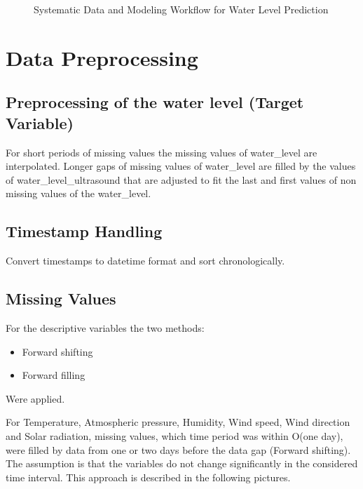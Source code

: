 \documentclass[a4paper,12pt]{article}
\begin{document}
\begin{figure}[H]
{
} %
\caption{Systematic Data and Modeling Workflow for Water Level Prediction}
\label{fig:workflow_pipeline}
\end{figure}

\section{Data Preprocessing}
\subsection{Preprocessing of the water level (Target Variable)}
For short periods of missing values the missing values of water\_level are interpolated. Longer gaps of missing values of water\_level are filled by the values of water\_level\_ultrasound that are adjusted to fit the last and first values of non missing values of the water\_level.

\subsection{Timestamp Handling}
Convert timestamps to datetime format and sort chronologically.

\subsection{Missing Values}
For the descriptive variables the two methods:

\begin{itemize}
    \item Forward shifting
    \item Forward filling
\end{itemize}
Were applied.

\vspace{\baselineskip}

For Temperature, Atmospheric pressure, Humidity, Wind speed, Wind direction and Solar radiation, missing values, which time period was within O(one day), were filled by data from one or two days before the data gap (Forward shifting).
The assumption is that the variables do not change significantly in the considered time interval. 
This approach is described in the following pictures.
\end{document}
